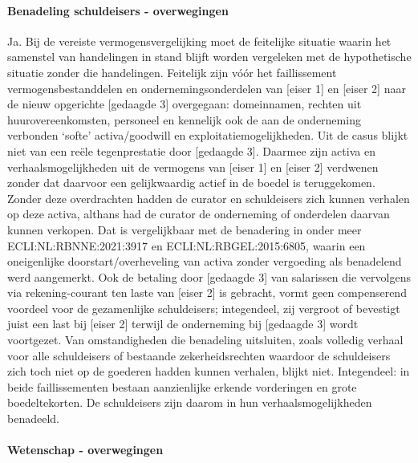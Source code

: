 \documentclass[
  dutch,
  a4paper,
]{article}
\begin{document}
\paragraph{Benadeling schuldeisers - overwegingen}\label{benadeling-schuldeisers---overwegingen-25}

Ja. Bij de vereiste vermogensvergelijking moet de feitelijke situatie waarin het samenstel van handelingen in stand blijft worden vergeleken met de hypothetische situatie zonder die handelingen. Feitelijk zijn vóór het faillissement vermogensbestanddelen en ondernemingsonderdelen van {[}eiser 1{]} en {[}eiser 2{]} naar de nieuw opgerichte {[}gedaagde 3{]} overgegaan: domeinnamen, rechten uit huurovereenkomsten, personeel en kennelijk ook de aan de onderneming verbonden `softe' activa/goodwill en exploitatiemogelijkheden. Uit de casus blijkt niet van een reële tegenprestatie door {[}gedaagde 3{]}. Daarmee zijn activa en verhaalsmogelijkheden uit de vermogens van {[}eiser 1{]} en {[}eiser 2{]} verdwenen zonder dat daarvoor een gelijkwaardig actief in de boedel is teruggekomen. Zonder deze overdrachten hadden de curator en schuldeisers zich kunnen verhalen op deze activa, althans had de curator de onderneming of onderdelen daarvan kunnen verkopen. Dat is vergelijkbaar met de benadering in onder meer ECLI:NL:RBNNE:2021:3917 en ECLI:NL:RBGEL:2015:6805, waarin een oneigenlijke doorstart/overheveling van activa zonder vergoeding als benadelend werd aangemerkt. Ook de betaling door {[}gedaagde 3{]} van salarissen die vervolgens via rekening-courant ten laste van {[}eiser 2{]} is gebracht, vormt geen compenserend voordeel voor de gezamenlijke schuldeisers; integendeel, zij vergroot of bevestigt juist een last bij {[}eiser 2{]} terwijl de onderneming bij {[}gedaagde 3{]} wordt voortgezet. Van omstandigheden die benadeling uitsluiten, zoals volledig verhaal voor alle schuldeisers of bestaande zekerheidsrechten waardoor de schuldeisers zich toch niet op de goederen hadden kunnen verhalen, blijkt niet. Integendeel: in beide faillissementen bestaan aanzienlijke erkende vorderingen en grote boedeltekorten. De schuldeisers zijn daarom in hun verhaalsmogelijkheden benadeeld.

\paragraph{Wetenschap - overwegingen}\label{wetenschap---overwegingen-25}
\end{document}

